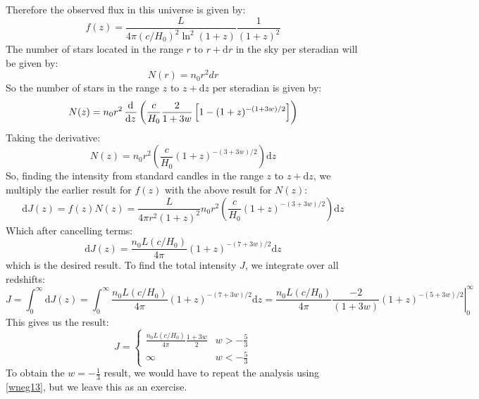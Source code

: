 Therefore the observed flux in this universe is given by:
\begin{equation}\label{wneg13}
    \boxed{f(z) = \frac{L}{4\pi(c/H_0)^2\ln^2(1+z)}\frac{1}{(1+z)^2}}
\end{equation}
The number of stars located in the range $r$ to $r + \mathrm d r$ in the sky per steradian will be given by:
\begin{equation}
    N(r) = n_0 r^2 dr
\end{equation}
So the number of stars in the range $z$ to $z + \mathrm d z$ per steradian is given by:
\begin{equation}
    N(z) = n_0 r^2 \dod{}{z}\left(\frac{c}{H_0}\frac{2}{1+3w}\left[1 - (1+z)^{-(1+3w)/2}\right]\right)
\end{equation}
Taking the derivative:
\begin{equation}
    N(z) =  n_0 r^2 \left(\frac{c}{H_0}(1+z)^{-(3 + 3w)/2}\right)\mathrm d z
\end{equation}
So, finding the intensity from standard candles in the range $z$ to $z + \mathrm d z$, we multiply the earlier result for $f(z)$ with the above result for $N(z)$:
\begin{equation}
    \mathrm d J(z) = f(z)N(z) = \frac{L}{4\pi r^2(1+z)^2} n_0 r^2\left(\frac{c}{H_0}(1+z)^{-(3 + 3w)/2}\right)\mathrm d z
\end{equation}
Which after cancelling terms:
\begin{equation}
    \boxed{\mathrm d J(z) = \frac{n_0L(c/H_0)}{4\pi}(1+z)^{-(7+3w)/2}\mathrm d z}
\end{equation}
which is the desired result. To find the total intensity $J$, we integrate over all redshifts:
\begin{equation}
    J = \int_0^\infty \mathrm d J(z) = \int_0^\infty  \frac{n_0L(c/H_0)}{4\pi}(1+z)^{-(7+3w)/2}\mathrm d z =   \left.\frac{n_0L(c/H_0)}{4\pi}\frac{-2}{(1+3w)}(1+z)^{-(5+3w)/2}\right|_0^\infty
\end{equation}
This gives us the result:
\begin{equation}
    J = \begin{cases}
        \frac{n_0 L(c/H_0)}{4\pi}\frac{1 + 3w}{2} & w > -\frac{5}{3}
        \\ \infty & w < -\frac{5}{3}
    \end{cases}
\end{equation}
To obtain the $w = -\frac{1}{3}$ result, we would have to repeat the analysis using \eqref{wneg13}, but we leave this as an exercise.


